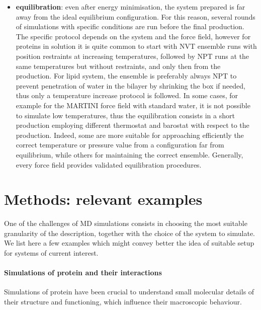 \begin{itemize}
\item \textbf{equilibration}: even after energy minimisation, the system prepared is far away from the ideal equilibrium configuration. For this reason, several rounds of simulations with specific conditions are run before the final production. The specific protocol depends on the system and the force field, however for proteins in solution it is quite common to start with NVT ensemble runs with position restraints at increasing temperatures, followed by NPT runs at the same temperatures but without restraints, and only then from the production. For lipid system, the ensemble is preferably always NPT to prevent penetration of water in the bilayer by shrinking the box if needed, thus only a temperature increase protocol is followed. In some cases, for example for the MARTINI force field with standard water, it is not possible to simulate low temperatures, thus the equilibration consists in a short production employing different thermostat and barostat with respect to the production. Indeed, some are more suitable for approaching efficiently the correct temperature or pressure value from a configuration far from equilibrium, while others for maintaining the correct ensemble. Generally, every force field provides validated equilibration procedures.
\end{itemize}


\section{Methods: relevant examples} \label{sec:methods}
One of the challenges of MD simulations consists in choosing the most suitable granularity of the description, together with the choice of the system to simulate. We list here a few examples which might convey better the idea of suitable setup  for systems of current interest.

\paragraph{Simulations of protein and their interactions}
Simulations of protein have been crucial to understand small molecular details of their structure and functioning, which influence their macroscopic behaviour.

